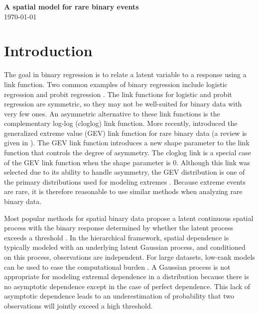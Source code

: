 \documentclass[11pt]{article}
\begin{document}
\linenumbers

\begin{center}
{\Large {\bf A spatial model for rare binary events}}\\
\today
\end{center}

\section{Introduction}\label{rbs:intro}

The goal in binary regression is to relate a latent variable to a response using a link function.
Two common examples of binary regression include logistic regression
and probit regression \citep{Agresti2003}.
The link functions for logistic and probit regression are symmetric, so they may not be well-suited for binary data with very few ones.
An asymmetric alternative to these link functions is the complementary log-log (cloglog) link function.
More recently, \citet{Wang2010} introduced the generalized extreme value (GEV) link function for rare binary data (a review is given in ).
The GEV link function introduces a new shape parameter to the link function that controls the degree of asymmetry.
The cloglog link is a special case of the GEV link function when the shape parameter is 0.
Although this link was selected due to its ability to handle asymmetry, the GEV distribution is one of the primary distributions used for modeling extremes \citep{Coles2001}.
Because extreme events are rare, it is therefore reasonable to use similar methods when analyzing rare binary data.

Most popular methods for spatial binary data propose a latent continuous spatial process with the binary response determined by whether the latent process exceeds a threshold \citep{DeOliveira2000,Diggle2007}.
In the hierarchical framework, spatial dependence is typically modeled with an underlying latent Gaussian process, and conditioned on this process, observations are independent.
For large datasets, low-rank models can be used to ease the computational burden \citep{Finley2015}.
A Gaussian process is not appropriate for modeling extremal dependence in a distribution because there is no asymptotic dependence except in the case of perfect dependence.
This lack of asymptotic dependence leads to an underestimation of probability that two observations will jointly exceed a high threshold.
\end{document}
